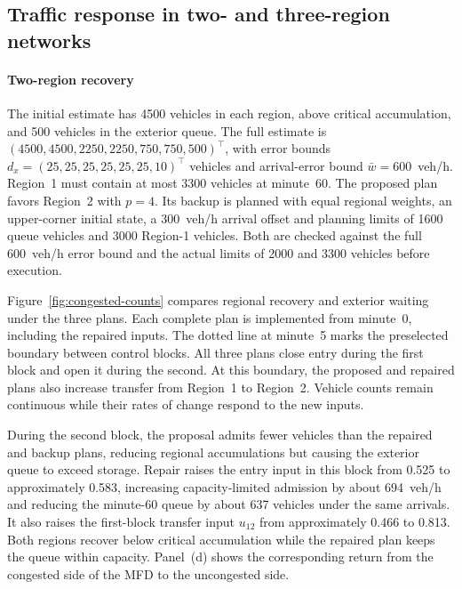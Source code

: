 \documentclass[final]{cas-sc}
\theoremstyle{definition}
\theoremstyle{plain}
\theoremstyle{definition}
\theoremstyle{plain}
\begin{document}
\subsection{Traffic response in two- and three-region networks}
\label{sec:congested-results}
\label{sec:controller-benchmarks}
\label{sec:new-mpc-results}

\paragraph{Two-region recovery}
The initial estimate has 4500 vehicles in each region, above critical
accumulation, and 500 vehicles in the exterior queue. The full
estimate is $(4500,4500,2250,2250,750,750,500)^\top$, with error bounds
$d_x=(25,25,25,25,25,25,10)^\top$ vehicles and arrival-error bound
$\bar w=600$~veh/h. Region~1 must contain at most 3300 vehicles at
minute~60. The proposed plan favors Region~2 with $p=4$. Its backup is
planned with equal regional weights, an upper-corner initial state,
a 300~veh/h arrival offset and planning limits of 1600 queue vehicles
and 3000 Region-1 vehicles. Both are checked against the full
600~veh/h error bound and the actual limits of 2000 and 3300 vehicles
before execution.

Figure~\ref{fig:congested-counts} compares regional recovery and
exterior waiting under the three plans. Each complete plan is
implemented from minute~0, including the repaired inputs. The dotted
line at minute~5 marks the preselected boundary between control blocks.
All three plans close entry during the first block and open it during
the second. At this boundary, the proposed and repaired plans also
increase transfer from Region~1 to Region~2. Vehicle counts remain
continuous while their rates of change respond to the new inputs.

During the second block, the proposal admits fewer vehicles than the
repaired and backup plans, reducing regional accumulations but causing
the exterior queue to exceed storage. Repair raises the entry input
in this block from 0.525 to approximately 0.583, increasing
capacity-limited admission by about 694~veh/h and reducing the
minute-60 queue by about 637 vehicles under the same arrivals.
It also raises the first-block transfer input $u_{12}$ from
approximately 0.466 to 0.813. Both regions recover below critical
accumulation while the repaired plan keeps the queue within capacity.
Panel~(d) shows the corresponding return from the congested side of
the MFD to the uncongested side.
\end{document}
